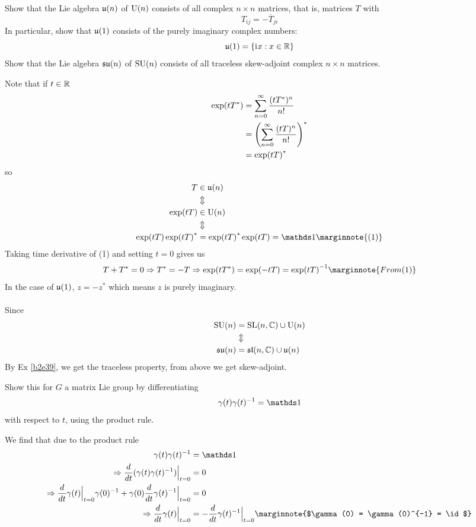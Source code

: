 \documentclass[10pt]{article}
\begin{document}
\begin{example}\label{b2e41}
	Show that the Lie algebra $\mf{u}(n)$ of $\U(n)$ consists of all  complex $n \times n$ matrices, that is, matrices $T$ with
	$$
	T_{ij}=-\overline T_{ji}
	$$
	In particular, show that $\mf{u}(1)$ consists of the purely imaginary complex numbers:
	$$
	\mf{u}(1) = \br{\di x:x\in\R}
	$$
	Show that the Lie algebra $\mf{su}(n)$ of $\SU(n)$ consists of all traceless skew-adjoint complex $n \times n$ matrices.
\end{example}
\sol Note that if $t \in \R$
$$
\begin{aligned}
	\exp(tT^*) &= \sum_{n=0}^{\infty} \frac{(tT^*)^n}{n!}\\
	&= \p*{\sum_{n=0}^{\infty} \frac{(tT)^n}{n!}}^*\\
	&= \exp(tT)^*
\end{aligned}
$$
so
$$
\begin{aligned}
	T &\in \mf{u}(n)\\
	&\Updownarrow\\
	\exp(tT) &\in \U(n)\\
	&\Updownarrow\\
	\exp(tT)\exp(tT)^* &= \exp(tT)^*\exp(tT) = \id\marginnote{(1)}
\end{aligned}
$$
Taking time derivative of (1) and setting $t=0$ gives us
$$
T+T^*=0 \Rightarrow T^*=-T \Rightarrow \exp(tT^*)=\exp(-tT) =\exp(tT)^{-1}\marginnote{From (1)}
$$
In the case of $\mf{u}(1)$, $z = -z^*$ which means $z$ is purely imaginary.\\\\
Since
$$
\begin{aligned}
	\SU(n) &= \SL(n,\C) \cup \U(n)\\
	&\Updownarrow\\
	\mf{su}(n) &= \mf{sl}(n,\C) \cup \mf{u}(n)\\
\end{aligned}
$$
By Ex \ref{b2e39}, we get the traceless property, from above we get skew-adjoint.


\begin{example}
	Show this for $G$ a matrix Lie group by differentiating
	$$
	\gamma(t)\gamma(t)^{-1} = \id
	$$
	with respect to $t$, using the product rule.
\end{example}
\sol We find that due to the product rule
$$
\begin{aligned}
	\gamma(t)\gamma(t)^{-1} &= \id\\
	\Rightarrow \frac{d}{dt}(\gamma(t)\gamma(t)^{-1})\Big|_{t=0} &= 0\\
	\Rightarrow \frac{d}{dt}\gamma(t)\Big|_{t=0}\gamma(0)^{-1} + \gamma(0)\frac{d}{dt}\gamma(t)^{-1}\Big|_{t=0} &= 0\\
	\Rightarrow \frac{d}{dt}\gamma(t)\Big|_{t=0} &= -\frac{d}{dt}\gamma(t)^{-1}\Big|_{t=0}\marginnote{$\gamma(0) = \gamma(0)^{-1} = \id$}
\end{aligned}
$$
\end{document}

